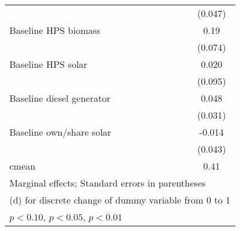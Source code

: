 \begin{table}[htbp]
\begin{tabular*}{1\hsize}{@{\hskip\tabcolsep\extracolsep\fill}l*{5}{c}}
                &                  &                  &                  &                  &  (0.047)         \\
Baseline HPS biomass&                  &                  &                  &                  &     0.19\sym{**} \\
                &                  &                  &                  &                  &  (0.074)         \\
Baseline HPS solar&                  &                  &                  &                  &    0.020         \\
                &                  &                  &                  &                  &  (0.095)         \\
Baseline diesel generator&                  &                  &                  &                  &    0.048         \\
                &                  &                  &                  &                  &  (0.031)         \\
Baseline own/share solar&                  &                  &                  &                  &   -0.014         \\
                &                  &                  &                  &                  &  (0.043)         \\
\midrule
cmean           &                  &                  &                  &                  &     0.41         \\
\bottomrule
\multicolumn{6}{l}{\footnotesize Marginal effects; Standard errors in parentheses}\\
\multicolumn{6}{l}{\footnotesize  (d) for discrete change of dummy variable from 0 to 1}\\
\multicolumn{6}{l}{\footnotesize \sym{*} \(p<0.10\), \sym{**} \(p<0.05\), \sym{***} \(p<0.01\)}\\
\end{tabular*}
\end{table}
